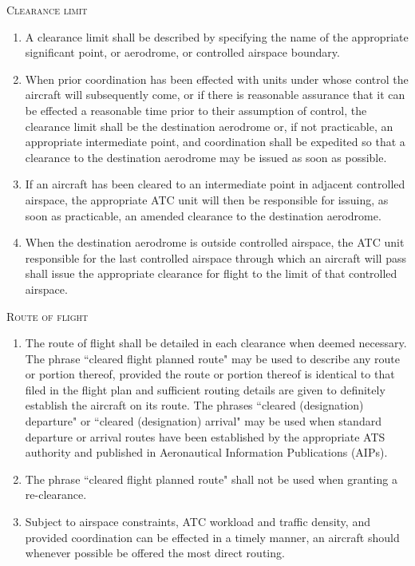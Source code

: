 \begin{enumeratesc}
    \item \textsc{Clearance limit}
    \begin{enumerate}
        \item A clearance limit shall be described by specifying the name of the appropriate significant point, or aerodrome, or controlled airspace boundary.
        \item When prior coordination has been effected with units under whose control the aircraft will subsequently come, or if there is reasonable assurance that it can be effected a reasonable time prior to their assumption of control, the clearance limit shall be the destination aerodrome or, if not practicable, an appropriate intermediate point, and coordination shall be expedited so that a clearance to the destination aerodrome may be issued as soon as possible.
        \item If an aircraft has been cleared to an intermediate point in adjacent controlled airspace, the appropriate ATC unit will then be responsible for issuing, as soon as practicable, an amended clearance to the destination aerodrome.
        \item When the destination aerodrome is outside controlled airspace, the ATC unit responsible for the last controlled airspace through which an aircraft will pass shall issue the appropriate clearance for flight to the limit of that controlled airspace.
    \end{enumerate}

    \item \textsc{Route of flight}
    \begin{enumerate}
        \item The route of flight shall be detailed in each clearance when deemed necessary. The phrase ``cleared flight planned route" may be used to describe any route or portion thereof, provided the route or portion thereof is identical to that filed in the flight plan and sufficient routing details are given to definitely establish the aircraft on its route. The phrases ``cleared (designation) departure" or ``cleared (designation) arrival" may be used when standard departure or arrival routes have been established by the appropriate ATS authority and published in Aeronautical Information Publications (AIPs).
        \item The phrase ``cleared flight planned route" shall not be used when granting a re-clearance.
        \item Subject to airspace constraints, ATC workload and traffic density, and provided coordination can be effected in a timely manner, an aircraft should whenever possible be offered the most direct routing.
    \end{enumerate}


\end{enumeratesc}
